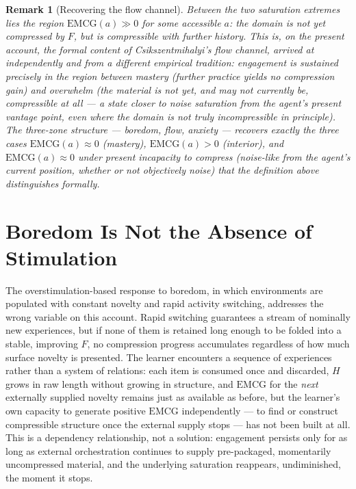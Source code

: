 \documentclass[11pt]{article}
\newtheorem*{remark}{Remark}
\begin{document}
\begin{remark}[Recovering the flow channel]
Between the two saturation extremes lies the region $\mathrm{EMCG}(a) \gg 0$ for some accessible $a$: the domain is not yet compressed by $F$, but is compressible with further history. This is, on the present account, the formal content of Csikszentmihalyi's flow channel, arrived at independently and from a different empirical tradition: engagement is sustained precisely in the region between mastery (further practice yields no compression gain) and overwhelm (the material is not yet, and may not currently be, compressible at all — a state closer to noise saturation from the agent's present vantage point, even where the domain is not truly incompressible in principle). The three-zone structure — boredom, flow, anxiety — recovers exactly the three cases $\mathrm{EMCG}(a) \approx 0$ (mastery), $\mathrm{EMCG}(a) > 0$ (interior), and $\mathrm{EMCG}(a) \approx 0$ under present incapacity to compress (noise-like from the agent's current position, whether or not objectively noise) that the definition above distinguishes formally.
\end{remark}

\section{Boredom Is Not the Absence of Stimulation}

The overstimulation-based response to boredom, in which environments are populated with constant novelty and rapid activity switching, addresses the wrong variable on this account. Rapid switching guarantees a stream of nominally new experiences, but if none of them is retained long enough to be folded into a stable, improving $F$, no compression progress accumulates regardless of how much surface novelty is presented. The learner encounters a sequence of experiences rather than a system of relations: each item is consumed once and discarded, $H$ grows in raw length without growing in structure, and $\mathrm{EMCG}$ for the \emph{next} externally supplied novelty remains just as available as before, but the learner's own capacity to generate positive $\mathrm{EMCG}$ independently — to find or construct compressible structure once the external supply stops — has not been built at all. This is a dependency relationship, not a solution: engagement persists only for as long as external orchestration continues to supply pre-packaged, momentarily uncompressed material, and the underlying saturation reappears, undiminished, the moment it stops.
\end{document}
